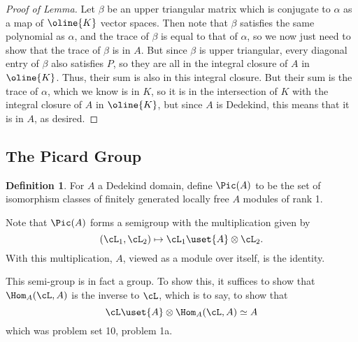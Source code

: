 \documentclass[12 pt]{article}
\theoremstyle{definition}
\newtheorem{defn}[thm]{Definition}
\renewcommand{\(}{\left(}
\renewcommand{\)}{\right)}
\begin{document}
\begin{proof}[Proof of Lemma]
Let $\beta$ be an upper triangular matrix which is conjugate to $\alpha$ as a map of $\oline{K}$ vector spaces. Then note that $\beta$ satisfies the same polynomial as $\alpha$, and the trace of $\beta$ is equal to that of $\alpha$, so we now just need to show that the trace of $\beta$ is in $A$. But since $\beta$ is upper triangular, every diagonal entry of $\beta$ also satisfies $P$, so they are all in the integral closure of $A$ in $\oline{K}$. Thus, their sum is also in this integral closure. But their sum is the trace of $\alpha$, which we know is in $K$, so it is in the intersection of $K$ with the integral closure of $A$ in $\oline{K}$, but since $A$ is Dedekind, this means that it is in $A$, as desired.



\phantom{\textbf{\textcolor[rgb]{0.98,0.00,0.00}{Perhaps there is a better way of thinking about all this that doesn't involve working with JNF and upper triangulation so much?}}}


\end{proof}







\subsection{The Picard Group}

\begin{defn}
For $A$ a Dedekind domain, define $\Pic(A)$ to be the set of isomorphism classes of finitely generated locally free $A$ modules of rank 1.
\end{defn}

Note that $\Pic(A)$ forms a semigroup with the multiplication given by
\[(\cL_1, \cL_2) \mapsto \cL_1 \uset{A}\otimes \cL_2.\]
With this multiplication, $A$, viewed as a module over itself, is the identity.

This semi-group is in fact a group. To show this, it suffices to show that $\Hom_A(\cL,A)$ is the inverse to $\cL$, which is to say, to show that
\[\cL \uset{A}\otimes \Hom_A(\cL,A) \simeq A\]
which was problem set 10, problem 1a.
\end{document}
